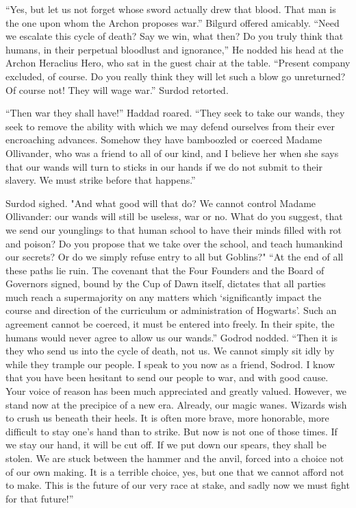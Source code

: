 “Yes, but let us not forget whose sword actually drew that blood. That man is the one upon whom the Archon proposes war.” Bilgurd offered amicably.
\SmallVSpace
“Need we escalate this cycle of death? Say we win, what then? Do you truly think that humans, in their perpetual bloodlust and ignorance,” He nodded his head at the Archon Heraclius Hero, who sat in the guest chair at the table. “Present company excluded, of course. Do you really think they will let such a blow go unreturned? Of course not! They will wage war.” Surdod retorted.

“Then war they shall have!” Haddad roared. “They seek to take our wands, they seek to remove the ability with which we may defend ourselves from their ever encroaching advances. Somehow they have bamboozled or coerced Madame Ollivander, who was a friend to all of our kind, and I believe her when she says that our wands will turn to sticks in our hands if we do not submit to their slavery. We must strike before that happens.”

Surdod sighed. "And what good will that do? We cannot control Madame Ollivander: our wands will still be useless, war or no. What do you suggest, that we send our younglings to that human school to have their minds filled with rot and poison? Do you propose that we take over the school, and teach humankind our secrets? Or do we simply refuse entry to all but Goblins?"
\SmallVSpace
“At the end of all these paths lie ruin. The covenant that the Four Founders and the Board of Governors signed, bound by the Cup of Dawn itself, dictates that all parties much reach a supermajority on any matters which ‘significantly impact the course and direction of the curriculum or administration of Hogwarts’. Such an agreement cannot be coerced, it must be entered into freely. In their spite, the humans would never agree to allow us our wands.”
\SmallVSpace
Godrod nodded. “Then it is they who send us into the cycle of death, not us. We cannot simply sit idly by while they trample our people. I speak to you now as a friend, Sodrod. I know that you have been hesitant to send our people to war, and with good cause. Your voice of reason has been much appreciated and greatly valued. However, we stand now at the precipice of a new era. Already, our magic wanes. Wizards wish to crush us beneath their heels. It is often more brave, more honorable, more difficult to stay one’s hand than to strike. But now is not one of those times. If we stay our hand, it will be cut off. If we put down our spears, they shall be stolen. We are stuck between the hammer and the anvil, forced into a choice not of our own making. It is a terrible choice, yes, but one that we cannot afford not to make. This is the future of our very race at stake, and sadly now we must fight for that future!”
\pagebreak

